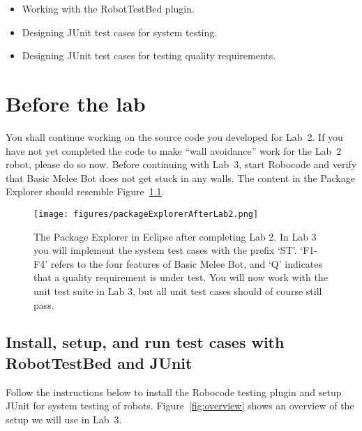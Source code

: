 \documentclass{scrreprt}
\begin{document}
\begin{itemize}
\item Working with the RobotTestBed plugin.
\item Designing JUnit test cases for system testing.
\item Designing JUnit test cases for testing quality requirements.
\end{itemize}

\vspace{1em}
\vspace{1em}

\chapter{Before the lab}
You shall continue working on the source code you developed for Lab~2. If you have not yet completed the code to make ``wall avoidance'' work for the Lab~2 robot, please do so now. Before continuing with Lab~3, start Robocode and verify that Basic Melee Bot does not get stuck in any walls. The content in the Package Explorer should resemble Figure~\ref{fig:packageExplorer}.

\begin{figure}
\centering
\texttt{[image: figures/packageExplorerAfterLab2.png]}
\caption{The Package Explorer in Eclipse after completing Lab 2. In Lab 3 you will implement the system test cases with the prefix `ST'. `F1-F4' refers to the four features of Basic Melee Bot, and `Q' indicates that a quality requirement is under test. You will now work with the unit test suite in Lab 3, but all unit test cases should of course still pass.}
\label{fig:packageExplorer}
\end{figure}

\section{Install, setup, and run test cases with RobotTestBed and JUnit}
Follow the instructions below to install the Robocode testing plugin and setup JUnit for system testing of robots. Figure~\ref{fig:overview} shows an overview of the setup we will use in Lab~3.
\end{document}
